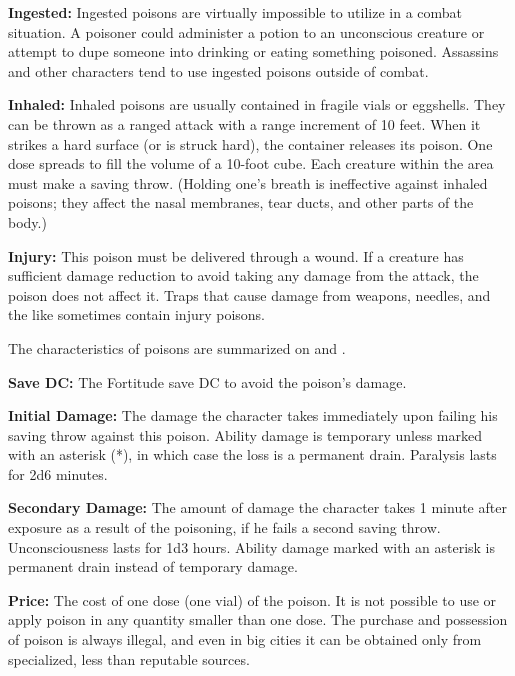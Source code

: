 \textbf{Ingested:} Ingested poisons are virtually impossible to utilize in a combat situation. A poisoner could administer a potion to an unconscious creature or attempt to dupe someone into drinking or eating something poisoned. Assassins and other characters tend to use ingested poisons outside of combat.

\textbf{Inhaled:} Inhaled poisons are usually contained in fragile vials or eggshells. They can be thrown as a ranged attack with a range increment of 10 feet. When it strikes a hard surface (or is struck hard), the container releases its poison. One dose spreads to fill the volume of a 10-foot cube. Each creature within the area must make a saving throw. (Holding one's breath is ineffective against inhaled poisons; they affect the nasal membranes, tear ducts, and other parts of the body.)

\textbf{Injury:} This poison must be delivered through a wound. If a creature has sufficient damage reduction to avoid taking any damage from the attack, the poison does not affect it. Traps that cause damage from weapons, needles, and the like sometimes contain injury poisons.

The characteristics of poisons are summarized on  and .




\textbf{Save DC:} The Fortitude save DC to avoid the poison's damage.

\textbf{Initial Damage:} The damage the character takes immediately upon failing his saving throw against this poison. Ability damage is temporary unless marked with an asterisk (*), in which case the loss is a permanent drain. Paralysis lasts for 2d6 minutes.

\textbf{Secondary Damage:} The amount of damage the character takes 1 minute after exposure as a result of the poisoning, if he fails a second saving throw. Unconsciousness lasts for 1d3 hours. Ability damage marked with an asterisk is permanent drain instead of temporary damage.

\textbf{Price:} The cost of one dose (one vial) of the poison. It is not possible to use or apply poison in any quantity smaller than one dose. The purchase and possession of poison is always illegal, and even in big cities it can be obtained only from specialized, less than reputable sources.


